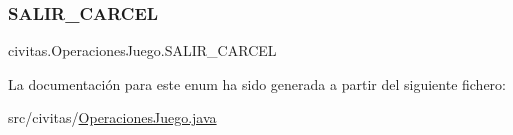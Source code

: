 \mbox{\label{enumcivitas_1_1OperacionesJuego_ac24c415e2a8b58b5a103cb1cadf2e71e}} 
\subsubsection{\texorpdfstring{S\+A\+L\+I\+R\+\_\+\+C\+A\+R\+C\+EL}{SALIR\_CARCEL}}
{\footnotesize\ttfamily civitas.\+Operaciones\+Juego.\+S\+A\+L\+I\+R\+\_\+\+C\+A\+R\+C\+EL}



La documentación para este enum ha sido generada a partir del siguiente fichero\+:\begin{DoxyCompactItemize}
\item 
src/civitas/\hyperlink{OperacionesJuego_8java}{Operaciones\+Juego.\+java}\end{DoxyCompactItemize}
